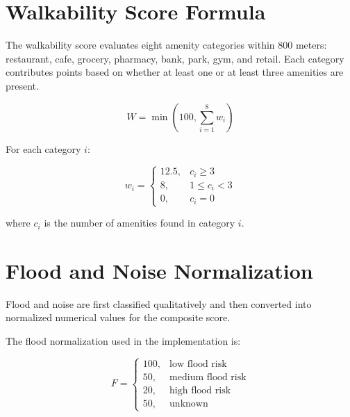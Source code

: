 \section{Walkability Score Formula}

The walkability score evaluates eight amenity categories within 800 meters: restaurant, cafe, grocery, pharmacy, bank, park, gym, and retail. Each category contributes points based on whether at least one or at least three amenities are present.

\begin{equation}
\label{eq:appendix-walkability-score}
W = \min\left(100, \sum_{i=1}^{8} w_i \right)
\end{equation}

For each category $i$:

\begin{equation}
w_i =
\begin{cases}
12.5, & c_i \geq 3 \\
8, & 1 \leq c_i < 3 \\
0, & c_i = 0
\end{cases}
\end{equation}

where $c_i$ is the number of amenities found in category $i$.

\section{Flood and Noise Normalization}

Flood and noise are first classified qualitatively and then converted into normalized numerical values for the composite score.

The flood normalization used in the implementation is:

\begin{equation}
F =
\begin{cases}
100, & \text{low flood risk} \\
50, & \text{medium flood risk} \\
20, & \text{high flood risk} \\
50, & \text{unknown}
\end{cases}
\end{equation}

